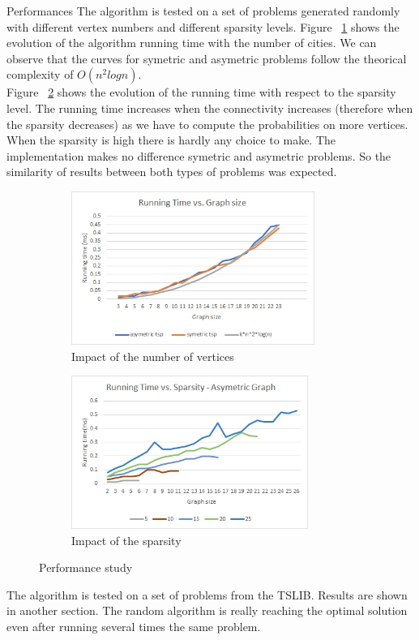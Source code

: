 \documentclass[../report.tex]{subfiles}
\begin{document}
\begin{subsection}{Performances}
The algorithm is tested on a set of problems generated randomly with different vertex numbers and different sparsity levels.
Figure ~\ref{fig:randomgraphsize} shows the evolution of the algorithm running time with the number of cities. We can observe that the curves for symetric and asymetric problems follow the theorical complexity of $O(n^2 log n)$. \\
Figure ~\ref{fig:randomsparsity} shows the evolution of the running time with respect to the sparsity level. The running time increases when the connectivity increases (therefore when the sparsity decreases) as we have to compute the probabilities on more vertices. When the sparsity is high there is hardly any choice to make.
The implementation makes no difference symetric and asymetric problems. So the similarity of results between both types of problems was expected.

\begin{figure}[H]
\centering
\begin{subfigure}{.5\textwidth}
\includegraphics[height=5cm,valign=t]{perf_random_graphsize.jpg}
\caption{Impact of the number of vertices \label{fig:randomgraphsize}}
\end{subfigure}%
\begin{subfigure}{.5\textwidth}
\includegraphics[height=5cm,valign=t]{perf_random_sparsity.jpg}
\caption{Impact of the sparsity \label{fig:randomsparsity}}
\end{subfigure}%
\caption{Performance study \label{fig:randomperf}}
\end{figure}

The algorithm is tested on a set of problems from the TSLIB. Results are shown in another section. The random algorithm is really reaching the optimal solution even after running several times the same problem.


\end{subsection}
\end{document}
